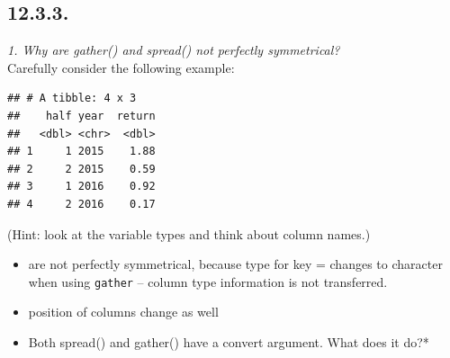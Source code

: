 \documentclass[]{book}
\newenvironment{Shaded}{\begin{snugshade}}{\end{snugshade}}
\newcommand{\DataTypeTok}[1]{\textcolor[rgb]{0.13,0.29,0.53}{#1}}
\newcommand{\DecValTok}[1]{\textcolor[rgb]{0.00,0.00,0.81}{#1}}
\newcommand{\FloatTok}[1]{\textcolor[rgb]{0.00,0.00,0.81}{#1}}
\newcommand{\KeywordTok}[1]{\textcolor[rgb]{0.13,0.29,0.53}{\textbf{#1}}}
\newcommand{\NormalTok}[1]{#1}
\newcommand{\OperatorTok}[1]{\textcolor[rgb]{0.81,0.36,0.00}{\textbf{#1}}}
\newcommand{\StringTok}[1]{\textcolor[rgb]{0.31,0.60,0.02}{#1}}
\theoremstyle{definition}
\theoremstyle{definition}
\theoremstyle{definition}
\theoremstyle{remark}
\begin{document}
\hypertarget{section-32}{%
\subsection{12.3.3.}\label{section-32}}

\emph{1. Why are gather() and spread() not perfectly symmetrical?}\\
Carefully consider the following example:

\begin{Shaded}
\end{Shaded}

\begin{verbatim}
## # A tibble: 4 x 3
##    half year  return
##   <dbl> <chr>  <dbl>
## 1     1 2015    1.88
## 2     2 2015    0.59
## 3     1 2016    0.92
## 4     2 2016    0.17
\end{verbatim}

(Hint: look at the variable types and think about column names.)

\begin{itemize}
\item
  are not perfectly symmetrical, because type for key = changes to
  character when using \texttt{gather} -- column type information is not
  transferred.\\
\item
  position of columns change as well
\item
  Both spread() and gather() have a convert argument. What does it do?*
\end{itemize}
\end{document}
